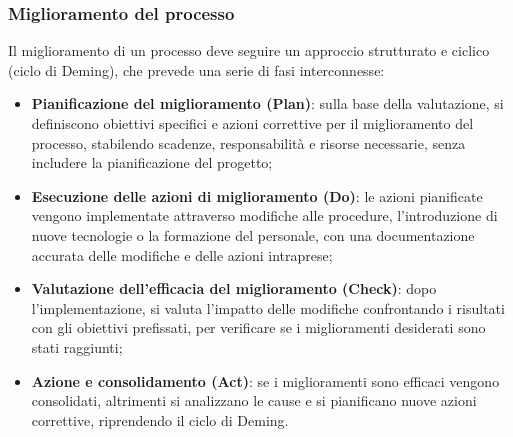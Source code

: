 \subsubsection{Miglioramento del processo}
Il miglioramento di un processo deve seguire un approccio strutturato e ciclico (ciclo di Deming), che prevede una serie di fasi interconnesse:
\begin{itemize}
    \item \textbf{Pianificazione del miglioramento (Plan)}: sulla base della valutazione, si definiscono obiettivi specifici e azioni correttive per il miglioramento del processo, stabilendo scadenze, responsabilità e risorse necessarie, senza includere la pianificazione del progetto;
    \item \textbf{Esecuzione delle azioni di miglioramento (Do)}: le azioni pianificate vengono implementate attraverso modifiche alle procedure, l'introduzione di nuove tecnologie o la formazione del personale, con una documentazione accurata delle modifiche e delle azioni intraprese;
    \item \textbf{Valutazione dell'efficacia del miglioramento (Check)}: dopo l'implementazione, si valuta l'impatto delle modifiche confrontando i risultati con gli obiettivi prefissati, per verificare se i miglioramenti desiderati sono stati raggiunti;
    \item \textbf{Azione e consolidamento (Act)}: se i miglioramenti sono efficaci vengono consolidati, altrimenti si analizzano le cause e si pianificano nuove azioni correttive, riprendendo il ciclo di Deming.
\end{itemize}